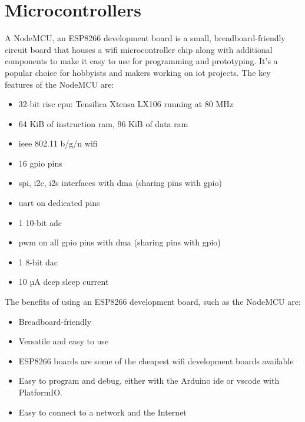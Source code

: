 \section{Microcontrollers}
\label{sec:controllers}
A NodeMCU, an ESP8266 development board is a small, breadboard-friendly circuit board that houses a \gls{wifi} microcontroller chip along with additional components to make 
it easy to use for programming and prototyping. It's a popular choice for hobbyists and makers working on \gls{iot} projects.
The key features of the NodeMCU are:
\begin{itemize}
	\item 32-bit \gls{risc} \gls{cpu}: Tensilica Xtensa LX106 running at 80 MHz
	\item 64 KiB of instruction \gls{ram}, 96 KiB of data \gls{ram}
	\item \gls{ieee} 802.11 b/g/n \gls{wifi}
	\item 16 \gls{gpio} pins
	\item \gls{spi}, \gls{i2c}, \gls{i2s} interfaces with \gls{dma} (sharing pins with \gls{gpio})
	\item \gls{uart} on dedicated pins
	\item 1 10-bit \gls{adc}
	\item \gls{pwm} on all \gls{gpio} pins with \gls{dma} (sharing pins with \gls{gpio})
	\item 1 8-bit \gls{dac}
	\item 10 µA deep sleep current
\end{itemize}
The benefits of using an ESP8266 development board, such as the NodeMCU are:
\begin{itemize}
	\item Breadboard-friendly
	\item Versatile and easy to use
	\item ESP8266 boards are some of the cheapest \gls{wifi} development boards available
	\item Easy to program and debug, either with the Arduino \gls{ide} or \gls{vscode} with PlatformIO.
	\item Easy to connect to a network and the Internet
\end{itemize}

